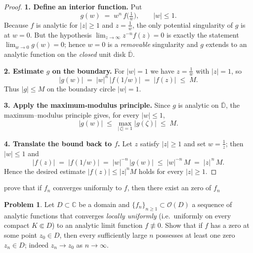 \documentclass[12pt]{article}
\theoremstyle{definition} %
\newtheorem{problem}{Problem}
\theoremstyle{plain} %
\begin{document}
  \begin{proof}
  \textbf{1.  Define an interior function.}
  Put
  \[
      g(w)\;=\;w^{n}\,f\!\bigl(\tfrac1w\bigr),\qquad |w|\le1 .
  \]
  Because \(f\) is analytic for \(|z|\ge1\) and \(z=\tfrac1w\),
  the only potential singularity of \(g\) is at \(w=0\).
  But the hypothesis
  \(\lim_{z\to\infty}z^{-n}f(z)=0\) is exactly the statement
  \(\lim_{w\to0}g(w)=0\); hence \(w=0\) is a \emph{removable}
  singularity and \(g\) extends to an analytic function on the
  \emph{closed} unit disk \(\overline{\mathbb D}\).
  
  \medskip
  \textbf{2.  Estimate \(g\) on the boundary.}
  For \(|w|=1\) we have \(z=\tfrac1w\) with \(|z|=1\), so
  \[
        |g(w)|
        \;=\;
        |w|^{n}\,|f(1/w)|
        \;=\;
        |f(z)|
        \;\le\;
        M .
  \]
  Thus \(\lvert g\rvert\le M\) on the boundary circle
  \(|w|=1\).
  
  \medskip
  \textbf{3.  Apply the maximum‐modulus principle.}
  Since \(g\) is analytic on \(\overline{\mathbb D}\),
  the maximum–modulus principle gives, for every \(|w|\le1\),
  \[
        |g(w)|\;\le\;\max_{|\,\zeta|=1}|g(\zeta)|
        \;\le\;M .
  \]
  
  \medskip
  \textbf{4.  Translate the bound back to \(f\).}
  Let \(z\) satisfy \(|z|\ge1\) and set \(w=\tfrac1z\); then
  \(|w|\le1\) and
  \[
        |f(z)|
        \;=\;
        |f(1/w)|
        \;=\;
        |w|^{-n}\,|g(w)|
        \;\le\;
        |w|^{-n}\,M
        \;=\;
        |z|^{\,n}\,M .
  \]
  Hence the desired estimate \( |f(z)| \le |z|^{n}M \) holds for
  every \(|z|\ge1\).
  \end{proof}

prove that if $f_n$ converges uniformly to $f$, then there exist an zero of $f_n$ 

\begin{problem}
  Let \(D\subset\mathbb C\) be a domain and
  \(\{f_n\}_{n\ge1}\subset\mathcal O(D)\) a sequence of analytic
  functions that converges \emph{locally uniformly} (i.e.\ uniformly on every
  compact \(K\Subset D\)) to an analytic limit function \(f\not\equiv0\).
  Show that if \(f\) has a zero at some point \(z_0\in D\), then every
  sufficiently large \(n\) possesses at least one zero \(z_n\in D\);
  indeed \(z_n\to z_0\) as \(n\to\infty\).
  \end{problem}
  
\end{document}

